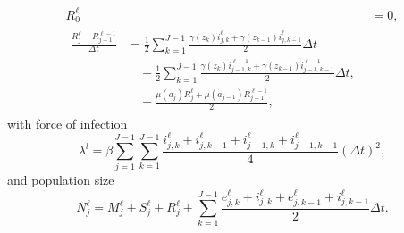 \documentclass{jpmarticle}
\let\subequationsorig\subequations%
\let\endsubequationsorig\endsubequations%
\renewenvironment{subequations}{
  \subequationsorig
  \renewcommand{\theequation}{\theparentequation.\arabic{equation}}
}{
  \endsubequationsorig
}
\begin{document}
\begin{subequations}
\begin{align}
    R_0^{\ell}
    &= 0,
    \\
    \begin{split}
      \frac{R_j^{\ell} - R_{j - 1}^{\ell - 1}}{\Delta t}
      &=
      \frac{1}{2} \sum_{k = 1}^{J - 1}
      \frac{\gamma(z_k) i_{j, k}^{\ell}
        + \gamma(z_{k - 1}) i_{j, k - 1}^{\ell}}
      {2}
      \Delta t
      \\ & \quad {}
      + \frac{1}{2} \sum_{k = 1}^{J - 1}
      \frac{\gamma(z_k) i_{j - 1, k}^{\ell - 1}
        + \gamma(z_{k - 1}) i_{j - 1, k - 1}^{\ell - 1}}
      {2}
      \Delta t,
      \\ & \quad {}
      - \frac{\mu(a_j) R_j^{\ell}
        + \mu(a_{j - 1})R_{j - 1}^{\ell - 1}}
      {2},
    \end{split}
  \end{align}
  with force of infection
  \begin{equation}
    \lambda^l =
    \beta
    \sum_{j = 1}^{J - 1}
    \sum_{k = 1}^{J - 1}
    \frac{i_{j, k}^{\ell}
      + i_{j, k - 1}^{\ell}
      + i_{j - 1, k}^{\ell}
      + i_{j - 1, k - 1}^{\ell}}
    {4}
    (\Delta t)^2,
  \end{equation}
  and population size
  \begin{equation}
    N_j^{\ell} =
    M_j^{\ell} + S_j^{\ell} + R_j^{\ell}
    + \sum_{k = 1}^{J - 1}
    \frac{e_{j, k}^{\ell} + i_{j, k}^{\ell}
      + e_{j, k - 1}^{\ell} + i_{j, k - 1}^{\ell}}
    {2}
    \Delta t.
  \end{equation}
\end{subequations}


\printbibliography
\end{document}
